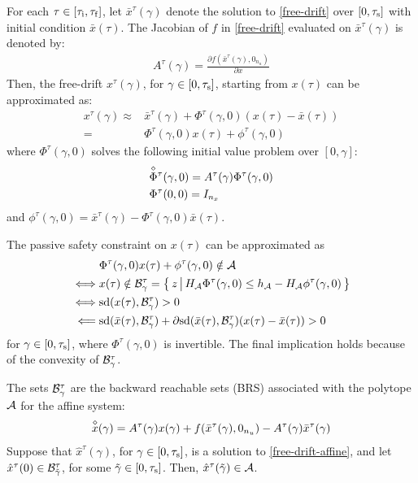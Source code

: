 \documentclass[11pt,a4paper]{article}
\begin{document}
For each $\tau\in[\tau_{\mathrm{i}},\tau_{\mathrm{f}}]$, let $\bar{x}^\tau(\gamma)$ denote the solution to \eqref{free-drift} over $[0,\tau_{\mathrm{s}}]$ with initial condition $\bar{x}(\tau)$. The Jacobian of $f$ in \eqref{free-drift} evaluated on $\bar{x}^\tau(\gamma)$ is denoted by:
\begin{align*}
    A^\tau(\gamma) = \frac{\partial f(\bar{x}^\tau(\gamma),0_{n_u})}{\partial x}
\end{align*}
Then, the free-drift $x^\tau(\gamma)$, for $\gamma\in[0,\tau_{\mathrm{s}}]$, starting from $x(\tau)$ can be approximated as:
\begin{align*}
    x^\tau(\gamma) \approx{} & \bar{x}^\tau(\gamma) + \Phi^\tau(\gamma,0)(x(\tau) - \bar{x}(\tau))\\
    ={} & \Phi^\tau(\gamma,0)x(\tau) + \phi^\tau(\gamma,0)
\end{align*}
where $\Phi^\tau(\gamma,0)$ solves the following initial value problem over $[0,\gamma]$:
\begin{subequations}
\begin{align}
    & \overset{\diamond}{\Phi}{}^{\tau}(\gamma,0) = A^\tau(\gamma)\Phi^\tau(\gamma,0)\\
    & \Phi^\tau(0,0) = I_{n_x}
\end{align}\label{free-drift-STM}%
\end{subequations}
and $\phi^\tau(\gamma,0) = \bar{x}^\tau(\gamma) - \Phi^\tau(\gamma,0)\bar{x}(\tau)$.

The passive safety constraint on $x(\tau)$ can be approximated as
\begin{align*}
     & \Phi^\tau(\gamma,0)x(\tau) + \phi^\tau(\gamma,0) \notin \mathcal{A}\\
\iff & x(\tau) \notin \mathcal{B}^\tau_\gamma = \big\{\,z\,\big|\,H_{\mathcal{A}}\Phi^\tau(\gamma,0)\le h_{\mathcal{A}}-H_{\mathcal{A}}\phi^\tau(\gamma,0)\,\big\}\\
\iff & \mathrm{sd}(x(\tau),\mathcal{B}^\tau_\gamma) > 0\\
\impliedby & \mathrm{sd}(\bar{x}(\tau),\mathcal{B}^\tau_\gamma) + \partial\mathrm{sd}(\bar{x}(\tau),\mathcal{B}^\tau_\gamma)(x(\tau)-\bar{x}(\tau)) > 0
\end{align*}
for $\gamma\in[0,\tau_{\mathrm{s}}]$, where $\Phi^\tau(\gamma,0)$ is invertible. The final implication holds because of the convexity of $\mathcal{B}^\tau_\gamma$.

The sets $\mathcal{B}^\tau_\gamma$ are the backward reachable sets (BRS) associated with the polytope $\mathcal{A}$ for the affine system:
\begin{align}
    \overset{\diamond}{x}(\gamma) = A^\tau(\gamma)x(\gamma) + f(\bar{x}^\tau(\gamma),0_{n_u})-A^\tau(\gamma)\bar{x}^\tau(\gamma)\label{free-drift-affine}
\end{align}
Suppose that $\hat{x}^\tau(\gamma)$, for $\gamma\in[0,\tau_{\mathrm{s}}]$, is a solution to \eqref{free-drift-affine}, and let $\hat{x}^\tau(0)\in\mathcal{B}^\tau_{\tilde{\gamma}}$, for some $\tilde{\gamma}\in[0,\tau_{\mathrm{s}}]$. Then, $\hat{x}^\tau(\tilde{\gamma}) \in \mathcal{A}$.
\end{document}
